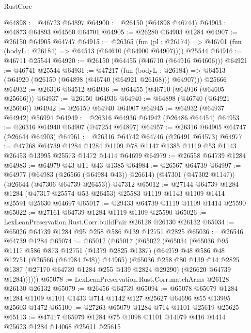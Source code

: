\begin{lexlean}{RustCore}
\begin{coremodule}
@64898 := @46723 @64897
@64900 := @26150 (@64898 @46744)
@64903 := @64873 @64893 @64560 @64701
@64905 := @26280 @64903 @1284
@64907 := @26150 @64905 @64747
@64915 := @26365
    (fun (pl : @26174) => @46701 (fun (bodyL : @26184) => @64513 (@64610 (@64900 @64907))))
    @25544
@64916 := @46711 @25544
@64920 := @26150 (@64455 (@46710 (@64916 @64606)))
@64921 := @46741 @25544
@64931 := @47217
    (fun (bodyL : @26184) => @64513 (@64920 (@26150 (@64898 (@46740 (@64921 @26168))) @64907)))
    @25666
@64932 := @26316 @64512
@64936 := @64455 (@46710 (@64916 (@64605 @25666)))
@64937 := @26150 @64936
@64940 := @64898 (@46740 (@64921 @25666))
@64942 := @26150 @64940 @64907
@64945 := @64932 (@64937 @64942) @56994
@64949 := @26316 @64936 @64942 (@26486 @64454)
@64953 := @26316 @64940 @64907 (@47254 @64897)
@64957 := @26316 @64905 @64747 (@26644 @64903)
@64961 := @26316 @64742 @64746 (@26491 @64573)
@64977 := @47268
    @64739
    @1284
    @1284
    @1109
    @78
    @1147
    @1385
    @1119
    @53
    @1143
    @26453
    @13995
    @25573
    @1472
    @1414
    @64699
@64979 := @26558 @64739 @1284
@64983 := @64979 @43 @11 @43 @1385
@64984 := @26567 @64739
@64997 := @64977
    (@64983 (@26566 (@64984 @43)) @26614)
    (@47301 (@47302 @1147))
    (@26644 (@47306 @64739 @26453))
    @47312
@65012 := @27144
    @64739
    @1284
    @1284
    (@47317 @25574 @53 @26453)
    @25583
    @1119
    @1143
    @1109
    @1414
    @25591
    @25630
    @64697
@65017 := @29433 @64739 @1119 @1109 @1414 @25590
@65022 := @27161 @64739 @1284 @1119 @1109 @25590
@65026 := LexLeanPreservation.Rust.Corr.buildPair @26128 @26130 @26132
@65034 := @65026 @64739 @1284 @95 @258 @586 @139 @12751 @2825
@65036 := @26546 @64739 @1284
@65074 := @65012
    (@65017
      (@65022
        (@65034
          (@65036
            @95
            @1117
            @586
            @873
            @12751
            (@1379 @2825 @1387)
            (@64979 @48 @586 @48 @12751 (@26566 (@64984 @48)) @44965)
            (@65036
              @258
              @80
              @139
              @14
              @2825
              @1387
              (@27170 @64739 @1284 @255 @139 @2824 @29290)
              (@26620 @64739 @1284))))))
@65078 := LexLeanPreservation.Rust.Corr.matchArms @26128 @26130 @26132
@65079 := @26456 @64739
@65094 := @65078
    @65079
    @1284
    @1284
    @1109
    @1101
    @1433
    @714
    @1142
    @127
    @25627
    @64696
    @55
    @13995
    @25603
    @1472
@65100 := @27263 @65079 @1284 @714 @1101 @25619 @25625
@65113 := @47417 @65079 @1284 @75 @1098 @1101 @14079 @416 @1414 @25623 @1284 @14068 @25611 @25615

\end{coremodule}
\end{lexlean}
